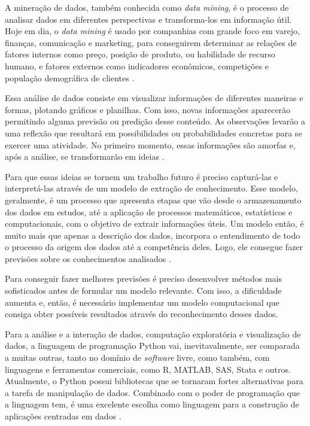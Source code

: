 A mineração de dados, também conhecida como \textit{data mining}, é o processo de analisar dados em diferentes perspectivas e transforma-los em informação útil. Hoje em dia, o \textit{data mining} é usado por companhias com grande foco em varejo, finanças, comunicação e marketing, para conseguirem determinar as relações de fatores internos como preço, posição de produto, ou habilidade de recurso humano, e fatores externos como indicadores econômicos, competições e população demográfica de clientes \cite{mining-social-web}.

Essa análise de dados consiste em visualizar informações de diferentes maneiras e formas, plotando gráficos e planilhas. Com isso, novas informações aparecerão permitindo alguma previsão ou predição desse conteúdo. As observações levarão a uma reflexão que resultará em possibilidades ou probabilidades concretas para se exercer uma atividade. No primeiro momento, essas informações são amorfas e, após a análise, se transformarão em ideias \cite{han}.

Para que essas ideias se tornem um trabalho futuro é preciso capturá-las e interpretá-las através de um modelo de extração de conhecimento. Esse modelo, geralmente, é um processo que apresenta etapas que vão desde o armazenamento dos dados em estudos, até a aplicação de processos matemáticos, estatísticos e computacionais, com o objetivo de extrair informações úteis. Um modelo então, é muito mais que apenas a descrição dos dados, incorpora o entendimento de todo o processo da origem dos dados até a competência deles. Logo, ele consegue fazer previsões sobre os conhecimentos analisados \cite{han}.

Para conseguir fazer melhores previsões é preciso desenvolver métodos mais sofisticados antes de formular um modelo relevante. Com isso, a dificuldade aumenta e, então, é necessário implementar um modelo computacional que consiga obter possíveis resultados através do reconhecimento desses dados.

Para a análise e a interação de dados, computação exploratória e visualização de dados, a linguagem de programação Python vai, inevitavalmente, ser comparada a muitas outras, tanto no domínio de \textit{software} livre, como também, com linguagens e ferramentas comerciais, como R, MATLAB, SAS, Stata e outros. Atualmente, o Python possui bibliotecas que se tornaram fortes alternativas para a tarefa de manipulação de dados. Combinado com o poder de programação que a linguagem tem, é uma excelente escolha como linguagem para a construção de aplicações centradas em dados \cite{python-analysis}.

